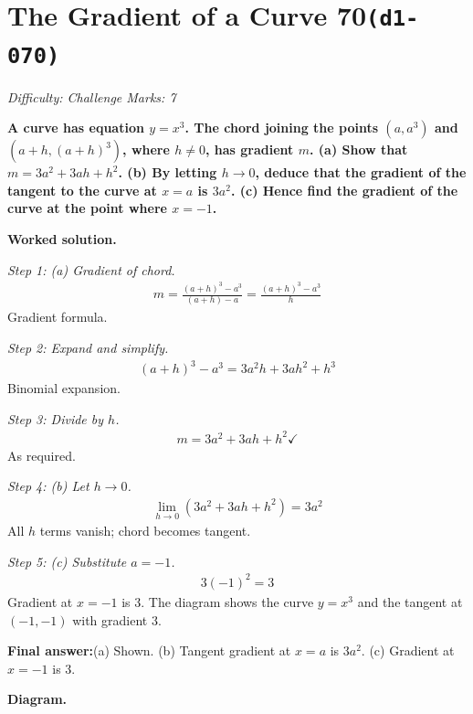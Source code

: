 \documentclass[11pt]{article}
\newcommand{\question}[1]{\par\medskip\noindent\textbf{#1}\par}
\begin{document}
\section*{The Gradient of a Curve 70\quad\small\texttt{(d1-070)}}
\textit{Difficulty: Challenge \quad\textbar\quad Marks: 7}

\question{A curve has equation \( y = x^3 \). The chord joining the points \( (a, a^3) \) and \( (a + h, (a+h)^3) \), where \( h \neq 0 \), has gradient \( m \). (a) Show that \( m = 3a^2 + 3ah + h^2 \). (b) By letting \( h \to 0 \), deduce that the gradient of the tangent to the curve at \( x = a \) is \( 3a^2 \). (c) Hence find the gradient of the curve at the point where \( x = -1 \).}

\textbf{Worked solution.}

\textit{Step 1: (a) Gradient of chord.}
\[\begin{gathered}
m = \frac{(a+h)^3 - a^3}{(a+h) - a} = \frac{(a+h)^3 - a^3}{h}
\end{gathered}\]
Gradient formula.

\textit{Step 2: Expand and simplify.}
\[\begin{gathered}
(a+h)^3 - a^3 = 3a^2 h + 3a h^2 + h^3
\end{gathered}\]
Binomial expansion.

\textit{Step 3: Divide by \( h \).}
\[\begin{gathered}
m = 3a^2 + 3ah + h^2 \checkmark
\end{gathered}\]
As required.

\textit{Step 4: (b) Let \( h \to 0 \).}
\[\begin{gathered}
\lim_{h \to 0}(3a^2 + 3ah + h^2) = 3a^2
\end{gathered}\]
All \( h \) terms vanish; chord becomes tangent.

\textit{Step 5: (c) Substitute \( a = -1 \).}
\[\begin{gathered}
3(-1)^2 = 3
\end{gathered}\]
Gradient at \( x = -1 \) is 3. The diagram shows the curve \( y = x^3 \) and the tangent at \( (-1, -1) \) with gradient 3.

\begin{answerbox}
\textbf{Final answer:}\quad (a) Shown. \quad  (b) Tangent gradient at \(\displaystyle  x = a \) is \(\displaystyle  3a^2 \). \quad  (c) Gradient at \(\displaystyle  x = -1 \) is 3.
\end{answerbox}
\textbf{Diagram.}
\end{document}

